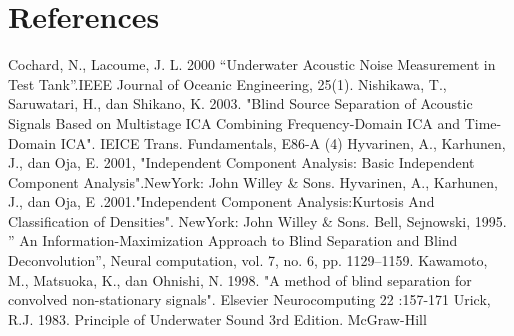 \documentclass[a4paper]{jpconf}
\begin{document}
\section*{References}
\begin{thebibliography}{9}
 Cochard, N., Lacoume, J. L. 2000 “Underwater Acoustic Noise Measurement in Test Tank”.IEEE Journal of Oceanic Engineering, 25(1).
 Nishikawa, T., Saruwatari, H., dan Shikano, K. 2003. "Blind Source Separation of Acoustic Signals Based on Multistage ICA Combining Frequency-Domain ICA and Time-Domain ICA". IEICE Trans. Fundamentals, E86-A (4)
 Hyvarinen, A., Karhunen, J., dan Oja, E. 2001, "Independent Component Analysis: Basic Independent Component Analysis".NewYork: John Willey \& Sons.
 Hyvarinen, A., Karhunen, J., dan Oja, E .2001."Independent Component Analysis:Kurtosis And Classification of Densities". NewYork: John Willey \& Sons.
 Bell, Sejnowski, 1995. ” An Information-Maximization Approach to Blind Separation and Blind Deconvolution”, Neural computation, vol. 7, no. 6, pp. 1129–1159.
 Kawamoto, M., Matsuoka, K., dan Ohnishi, N. 1998. "A method of blind separation for convolved non-stationary signals". Elsevier Neurocomputing 22 :157-171
 Urick, R.J. 1983. Principle of Underwater Sound 3rd Edition. McGraw-Hill 
\end{thebibliography}
\end{document}

